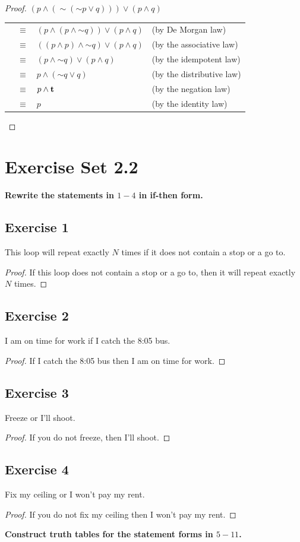 \documentclass[14pt]{extarticle}
\begin{document}
\begin{proof} $(p \wedge ({\sim ({\sim p} \vee q)})) \vee (p \wedge q)$
\begin{tabular}{rcll} & $\equiv$ & $(p \wedge (p \wedge {\sim q})) \vee (p
\wedge q)$ & (by De Morgan law) \\ & $\equiv$ & $((p \wedge p) \wedge {\sim q})
\vee (p \wedge q)$ & (by the associative law) \\ & $\equiv$ & $(p \wedge {\sim
q}) \vee (p \wedge q)$ & (by the idempotent law) \\ & $\equiv$ & $p \wedge
({\sim q} \vee q)$ & (by the distributive law) \\ & $\equiv$ & $p \wedge {\bf t}$
& (by the negation law) \\ & $\equiv$ & $p$ & (by the identity law) \\
\end{tabular} \end{proof}

\section{Exercise Set 2.2} {\bf Rewrite the statements in $1-4$ in if-then
form.}

\subsection{Exercise 1} This loop will repeat exactly $N$ times if it does not
contain a stop or a go to.

\begin{proof} If this loop does not contain a stop or a go to, then it will
repeat exactly $N$ times. \end{proof}

\subsection{Exercise 2} I am on time for work if I catch the 8:05 bus.
\begin{proof} If I catch the 8:05 bus then I am on time for work. \end{proof}
\subsection{Exercise 3} Freeze or I’ll shoot.
\begin{proof} If you do not freeze, then I’ll shoot. \end{proof}
\subsection{Exercise 4} Fix my ceiling or I won’t pay my rent.
\begin{proof} If you do not fix my ceiling then I won't pay my rent. \end{proof}
{\bf Construct truth tables for the statement forms in $5-11$.}
\end{document}
